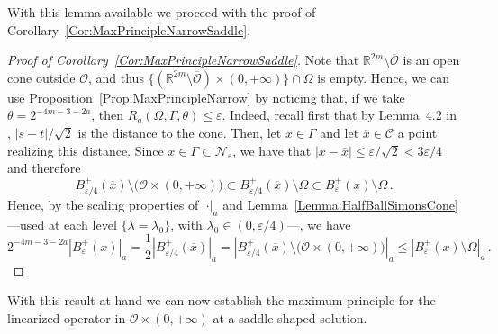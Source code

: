 \documentclass[12pt,reqno]{amsart}
\theoremstyle{definition}
\theoremstyle{remark}
\newcommand{\con}[1]{\mathbb{#1}}
\newcommand{\R}{\con{R}} %
\newcommand{\ccal}{\mathscr{C}}
\newcommand{\ncal}{\mathcal{N}}
\newcommand{\ocal}{\mathcal{O}}
\numberwithin{equation}{section}
\begin{document}
With this lemma available we proceed with the proof of Corollary~\ref{Cor:MaxPrincipleNarrowSaddle}.

\begin{proof}[Proof of Corollary~\ref{Cor:MaxPrincipleNarrowSaddle}]
Note that $\R^{2m} \setminus \overline{\ocal}$ is an open cone outside $\ocal$, and thus $\{ (\R^{2m} \setminus \overline{\ocal}) \times (0, +\infty) \} \cap \Omega $ is empty. Hence, we can use Proposition~\ref{Prop:MaxPrincipleNarrow} by noticing that,  if we take $\theta = 2^{-4m - 3-2a}$, then $R_a(\Omega,\Gamma,\theta)\leq \varepsilon$. Indeed, recall first that by Lemma~4.2 in \cite{CabreTerraI}, $|s-t|/\sqrt{2}$ is the distance to the cone. Then, let $x\in \Gamma$ and let $\overline{x}\in \ccal$ a point realizing this distance. Since $x\in \Gamma \subset \ncal_\varepsilon$, we have that $|x-\overline{x}| \leq \varepsilon /\sqrt{2} < 3\varepsilon /4$ and therefore
$$
B_{\varepsilon/4}^+ (\overline{x})\setminus \big( \ocal \times (0, +\infty)\big) \subset B_{\varepsilon/4}^+ (\overline{x})\setminus \Omega \subset B_\varepsilon^+ (x)\setminus \Omega\,.
$$
Hence, by the scaling properties of $|\cdot|_a$ and Lemma~\ref{Lemma:HalfBallSimonsCone} ---used at each level $\{\lambda = \lambda_0\}$, with $\lambda_0\in (0,\varepsilon/4)$---, we have
$$
2^{-4m - 3-2a} |B^+_\varepsilon (x)|_a = \dfrac{1}{2} |B_{\varepsilon/4}^+(\overline{x}) |_a = |B_{\varepsilon/4}^+ (\overline{x})\setminus \big( \ocal \times (0, +\infty)\big)  |_a \leq |B_\varepsilon^+ (x)\setminus \Omega |_a\,.
$$
\end{proof}


With this result at hand we can now establish the maximum principle for the linearized operator in $\ocal\times (0,+\infty)$ at a saddle-shaped solution.
\end{document}
